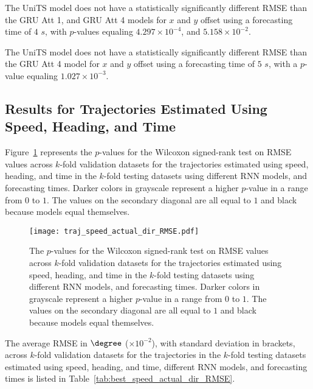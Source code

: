 The UniTS model does not have a statistically significantly different RMSE than the GRU Att 1, and GRU Att 4 models for $x$ and $y$ offset using a forecasting time of $4$ $s$, with $p$-values equaling $4.297 \times 10^{-4}$, and $5.158 \times 10^{-2}$.

The UniTS model does not have a statistically significantly different RMSE than the GRU Att 4 model for $x$ and $y$ offset using a forecasting time of $5$ $s$, with a $p$-value equaling $1.027 \times 10^{-3}$.

\subsection{Results for Trajectories Estimated Using Speed, Heading, and Time}

Figure~\ref{fig:traj_speed_actual_dir_RMSE} represents the $p$-values for the Wilcoxon signed-rank test on RMSE values across $k$-fold validation datasets for the trajectories estimated using speed, heading, and time in the $k$-fold testing datasets using different RNN models, and forecasting times. Darker colors in grayscale represent a higher $p$-value in a range from $0$ to $1$. The values on the secondary diagonal are all equal to $1$ and black because models equal themselves.

\begin{figure}[!ht]
	\centering
	\texttt{[image: traj\_speed\_actual\_dir\_RMSE.pdf]}
	\caption{The $p$-values for the Wilcoxon signed-rank test on RMSE values across $k$-fold validation datasets for the trajectories estimated using speed, heading, and time in the $k$-fold testing datasets using different RNN models, and forecasting times. Darker colors in grayscale represent a higher $p$-value in a range from $0$ to $1$. The values on the secondary diagonal are all equal to $1$ and black because models equal themselves.}
	\label{fig:traj_speed_actual_dir_RMSE}
\end{figure}

The average RMSE in $\degree$ ($\times 10^{-2}$), with standard deviation in brackets, across $k$-fold validation datasets for the trajectories in the $k$-fold testing datasets estimated using speed, heading, and time, different RNN models, and forecasting times is listed in Table~\ref{tab:best_speed_actual_dir_RMSE}.

